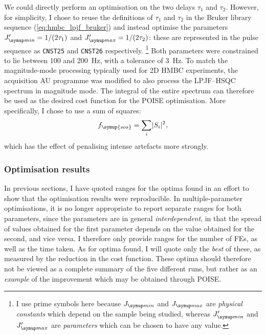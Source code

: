 We could directly perform an optimisation on the two delays $\tau_1$ and $\tau_2$.
However, for simplicity, I chose to reuse the definitions of $\tau_1$ and $\tau_2$ in the Bruker library sequence (\cref{eq:hmbc_lpjf_bruker}) and instead optimise the parameters $\Jmin' = 1/(2\tau_1)$ and $\Jmax' = 1/(2\tau_2)$: these are represented in the pulse sequence as \texttt{CNST25} and \texttt{CNST26} respectively.%
\footnote{I use prime symbols here because $\Jmin$ and $\Jmax$ are \textit{physical constants} which depend on the sample being studied, whereas $\Jmin'$ and $\Jmax'$ are \textit{parameters} which can be chosen to have any value.} 
Both parameters were constrained to lie between 100 and \qty{200}{\Hz}, with a tolerance of \qty{3}{\Hz}.
To match the magnitude-mode processing typically used for 2D HMBC experiments, the acquisition AU programme was modified to also process the LPJF--HSQC spectrum in magnitude mode.
The integral of the entire spectrum can therefore be used as the desired cost function for the POISE optimisation.
More specifically, I chose to use a sum of squares:
\begin{equation}
    \label{eq:sos_cost_function}
    f_{\symup{sos}} = \sum_i \lvert S_i \rvert^2,
\end{equation}
which has the effect of penalising intense artefacts more strongly.


\subsubsection{Optimisation results}

In previous sections, I have quoted ranges for the optima found in an effort to show that the optimisation results were reproducible.
In multiple-parameter optimisations, it is no longer appropriate to report separate ranges for both parameters, since the parameters are in general \textit{interdependent}, in that the spread of values obtained for the first parameter depends on the value obtained for the second, and vice versa.
I therefore only provide ranges for the number of FEs, as well as the time taken.
As for optima found, I will quote only the \textit{best} of these, as measured by the reduction in the cost function.
These optima should therefore not be viewed as a complete summary of the five different runs, but rather as an \textit{example} of the improvement which may be obtained through POISE.

